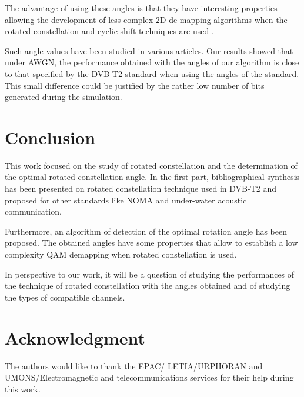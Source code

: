 The advantage of using these angles is that they have
interesting properties allowing the development of less
complex 2D de-mapping algorithms when the rotated
constellation and cyclic shift techniques are used
\cite{ref5}.

Such angle values have been studied in various articles.
Our results showed that under AWGN, the performance
obtained with the angles of our algorithm is close to
that specified by the DVB-T2 standard when using the
angles of the standard. This small difference could
be justified by the rather low number of bits
generated during the simulation.

\section{Conclusion}

This work focused on the study of rotated constellation
and the determination of the optimal rotated constellation
angle. In the first part, bibliographical synthesis has
been presented on rotated constellation technique used
in DVB-T2 and proposed for other standards like NOMA
and under-water acoustic communication.

Furthermore, an algorithm of detection of the optimal
rotation angle has been proposed. The obtained angles
have some properties that allow to establish a low
complexity QAM demapping when rotated constellation
is used.

In perspective to our work, it will be a question of
studying the performances of the technique of rotated
constellation with the angles obtained and of studying
the types of compatible channels.

\section*{Acknowledgment}

The authors would like to thank the EPAC/
LETIA/URPHORAN and UMONS/Electromagnetic and
telecommunications services for their help during
this work.

